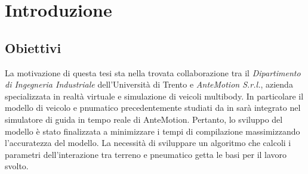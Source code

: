 \chapter{Introduzione}
\label{Introduzione}
%
\section{Obiettivi}
La motivazione di questa tesi sta nella trovata collaborazione tra il \textit{Dipartimento di Ingegneria Industriale} dell'Università di Trento e \textit{AnteMotion S.r.l.}, azienda specializzata in realtà virtuale e simulazione di veicoli multibody. In particolare il modello di veicolo e pnumatico precedentemente studiati da \citeauthor{Larcher} in \cite{Larcher} sarà integrato nel simulatore di guida in tempo reale di AnteMotion. Pertanto, lo sviluppo del modello è stato finalizzata a minimizzare i tempi di compilazione massimizzando l'accuratezza del modello. La necessità di sviluppare un algoritmo che calcoli i parametri dell'interazione tra terreno e pneumatico getta le basi per il lavoro svolto.
%
